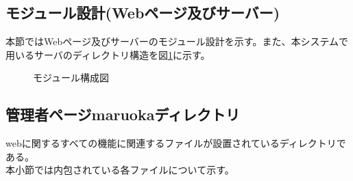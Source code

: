 \documentclass[a4j]{jarticle}
\begin{document}
\subsection{モジュール設計(Webページ及びサーバー)}

本節ではWebページ及びサーバーのモジュール設計を示す。また、本システムで用いるサーバのディレクトリ構造を図\ref{tab:oonishimoj}に示す。

\begin{figure}[H]
\begin{center}
\caption{モジュール構成図}
\label{tab:oonishimoj}
\end{center}
\end{figure}
\subsection{管理者ページmaruokaディレクトリ}
webに関するすべての機能に関連するファイルが設置されているディレクトリである。\\
本小節では内包されている各ファイルについて示す。
\end{document}
